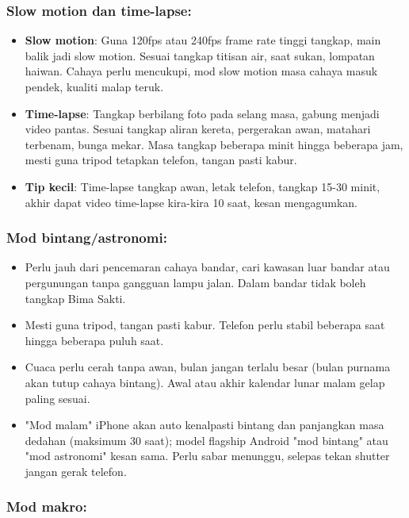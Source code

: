 \subsubsection*{Slow motion dan time-lapse:}

\begin{itemize}
  \item \textbf{Slow motion}: Guna 120fps atau 240fps frame rate tinggi tangkap, main balik jadi slow motion. Sesuai tangkap titisan air, saat sukan, lompatan haiwan. Cahaya perlu mencukupi, mod slow motion masa cahaya masuk pendek, kualiti malap teruk.
  \item \textbf{Time-lapse}: Tangkap berbilang foto pada selang masa, gabung menjadi video pantas. Sesuai tangkap aliran kereta, pergerakan awan, matahari terbenam, bunga mekar. Masa tangkap beberapa minit hingga beberapa jam, mesti guna tripod tetapkan telefon, tangan pasti kabur.
  \item \textbf{Tip kecil}: Time-lapse tangkap awan, letak telefon, tangkap 15-30 minit, akhir dapat video time-lapse kira-kira 10 saat, kesan mengagumkan.
\end{itemize}

\subsubsection*{Mod bintang/astronomi:}

\begin{itemize}
  \item Perlu jauh dari pencemaran cahaya bandar, cari kawasan luar bandar atau pergunungan tanpa gangguan lampu jalan. Dalam bandar tidak boleh tangkap Bima Sakti.
  \item Mesti guna tripod, tangan pasti kabur. Telefon perlu stabil beberapa saat hingga beberapa puluh saat.
  \item Cuaca perlu cerah tanpa awan, bulan jangan terlalu besar (bulan purnama akan tutup cahaya bintang). Awal atau akhir kalendar lunar malam gelap paling sesuai.
  \item "Mod malam" iPhone akan auto kenalpasti bintang dan panjangkan masa dedahan (maksimum 30 saat); model flagship Android "mod bintang" atau "mod astronomi" kesan sama. Perlu sabar menunggu, selepas tekan shutter jangan gerak telefon.
\end{itemize}

\subsubsection*{Mod makro:}

